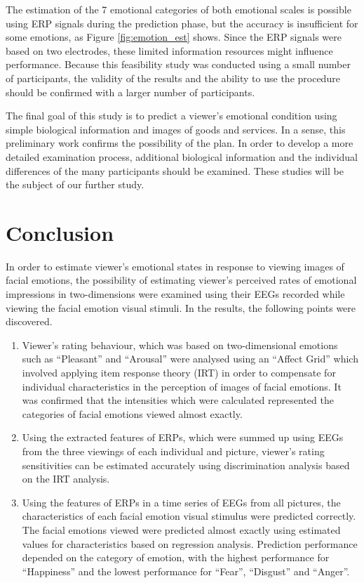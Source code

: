 \documentclass[fonts]{icst}
\begin{document}
The estimation of the 7 emotional categories of both emotional scales
is possible using ERP signals during the prediction phase, 
but the accuracy is insufficient for some emotions, as Figure
\ref{fig:emotion_est} shows. 
Since the ERP signals were based on two electrodes, these limited
information resources might influence performance. 
Because this feasibility study was conducted using a small number of
participants, the validity of the results and the ability to use the
procedure should be confirmed with a larger number of participants. 

The final goal of this study is to predict a viewer's emotional
condition using simple biological information and images of goods and
services.   
In a sense, this preliminary work confirms the possibility of the
plan. In order to develop a more detailed examination process,
additional biological 
information and the individual differences of the many participants
should be examined.  
These studies will be the subject of our further study. 


\section{Conclusion}

In order to estimate viewer's emotional states in response to viewing
images of facial emotions, the possibility of estimating viewer's
perceived rates of emotional impressions in two-dimensions
were examined using their EEGs recorded while viewing the facial emotion
visual stimuli. 
In the results, the following points were discovered. 

\begin{enumerate}
\item Viewer's rating behaviour, which was based on two-dimensional
      emotions such as ``Pleasant'' and ``Arousal'' were analysed using
      an ``Affect Grid'' which involved applying item response theory
      (IRT) in order to compensate for individual characteristics in the
      perception of images of facial emotions.
      It was confirmed that the intensities which were calculated represented 
      the categories of facial emotions viewed almost exactly.
\item Using the extracted features of ERPs, which were summed up using
      EEGs from the three viewings of each individual and picture, viewer's
      rating sensitivities can be estimated accurately using 
      discrimination analysis based on the IRT analysis.
\item Using the features of ERPs in a time series of EEGs from all pictures,
      the characteristics of each facial emotion visual stimulus were
      predicted correctly.  
      The facial emotions viewed were predicted almost exactly using estimated 
      values for characteristics based on regression analysis. Prediction
      performance depended on the category of emotion, with the highest
      performance for ``Happiness'' and the lowest performance for ``Fear'',
      ``Disgust'' and ``Anger''.
\end{enumerate}
\end{document}
